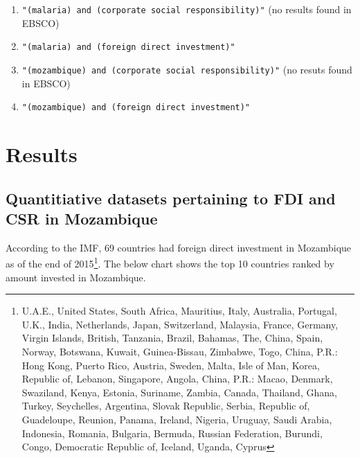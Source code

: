 \documentclass[]{article}
\providecommand{\tightlist}{%
  \setlength{\itemsep}{0pt}\setlength{\parskip}{0pt}}
\let\rmarkdownfootnote\footnote%
\def\footnote{\protect\rmarkdownfootnote}
\begin{document}
\begin{enumerate}
\def\labelenumi{\arabic{enumi}.}
\tightlist
\item
  \texttt{"(malaria)\ and\ (corporate\ social\ responsibility)"} (no
  results found in EBSCO)
\item
  \texttt{"(malaria)\ and\ (foreign\ direct\ investment)"}
\item
  \texttt{"(mozambique)\ and\ (corporate\ social\ responsibility)"} (no
  resuts found in EBSCO)
\item
  \texttt{"(mozambique)\ and\ (foreign\ direct\ investment)"}
\end{enumerate}

\section{Results}\label{results}

\subsection{Quantitiative datasets pertaining to FDI and CSR in
Mozambique}\label{quantitiative-datasets-pertaining-to-fdi-and-csr-in-mozambique}

According to the IMF, 69 countries had foreign direct investment in
Mozambique as of the end of
2015\footnote{U.A.E., United States, South Africa, Mauritius, Italy, Australia, Portugal, U.K., India, Netherlands, Japan, Switzerland, Malaysia, France, Germany, Virgin Islands, British, Tanzania, Brazil, Bahamas, The, China, Spain, Norway, Botswana, Kuwait, Guinea-Bissau, Zimbabwe, Togo, China, P.R.: Hong Kong, Puerto Rico, Austria, Sweden, Malta, Isle of Man, Korea, Republic of, Lebanon, Singapore, Angola, China, P.R.: Macao, Denmark, Swaziland, Kenya, Estonia, Suriname, Zambia, Canada, Thailand, Ghana, Turkey, Seychelles, Argentina, Slovak Republic, Serbia, Republic of, Guadeloupe, Reunion, Panama, Ireland, Nigeria, Uruguay, Saudi Arabia, Indonesia, Romania, Bulgaria, Bermuda, Russian Federation, Burundi, Congo, Democratic Republic of, Iceland, Uganda, Cyprus}.
The below chart shows the top 10 countries ranked by amount invested in
Mozambique.
\end{document}

